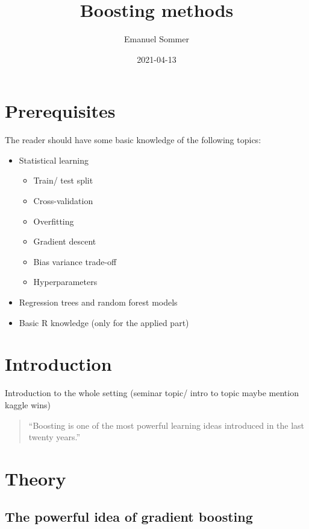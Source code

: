 \documentclass[
]{book}
\title{Boosting methods}
\author{Emanuel Sommer}
\date{2021-04-13}
\begin{document}
\maketitle

{
\setcounter{tocdepth}{1}
\tableofcontents
}
\hypertarget{prerequisites}{%
\chapter{Prerequisites}\label{prerequisites}}

The reader should have some basic knowledge of the following topics:

\begin{itemize}
\item
  Statistical learning

  \begin{itemize}
  \item
    Train/ test split
  \item
    Cross-validation
  \item
    Overfitting
  \item
    Gradient descent
  \item
    Bias variance trade-off
  \item
    Hyperparameters
  \end{itemize}
\item
  Regression trees and random forest models
\item
  Basic R knowledge (only for the applied part)
\end{itemize}

\hypertarget{intro}{%
\chapter{Introduction}\label{intro}}

Introduction to the whole setting (seminar topic/ intro to topic maybe mention kaggle wins)

\begin{quote}
``Boosting is one of the most powerful learning ideas introduced in the last
twenty years.'' \citep{elements}
\end{quote}

\hypertarget{theory}{%
\chapter{Theory}\label{theory}}

\hypertarget{the-powerful-idea-of-gradient-boosting}{%
\section{The powerful idea of gradient boosting}\label{the-powerful-idea-of-gradient-boosting}}
\end{document}
